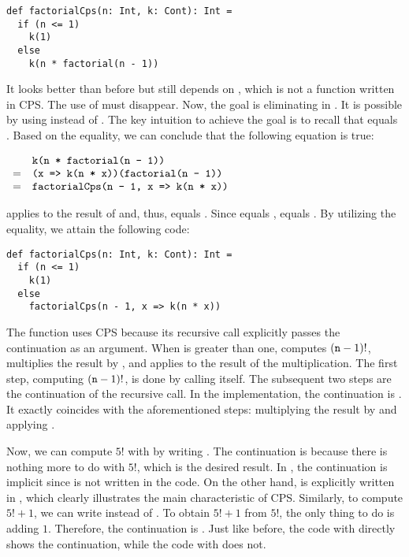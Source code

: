 \begin{verbatim}
def factorialCps(n: Int, k: Cont): Int =
  if (n <= 1)
    k(1)
  else
    k(n * factorial(n - 1))
\end{verbatim}

It looks better than before but still depends on , which is not
a function written in CPS. The use of  must disappear. Now, the
goal is eliminating  in . It is
possible by using  instead of . The key
intuition to achieve the goal is to recall that  equals
. Based on the equality, we can conclude that the following
equation is true:

$
\begin{array}{cl}
& \texttt{k(n * factorial(n - 1))} \\
= & \texttt{(x => k(n * x))(factorial(n - 1))} \\
= & \texttt{factorialCps(n - 1, x => k(n * x))} \\
\end{array}
$

 applies  to the
result of  and, thus, equals . Since  equals ,
 equals
. By utilizing the equality, we attain
the following code:

\begin{verbatim}
def factorialCps(n: Int, k: Cont): Int =
  if (n <= 1)
    k(1)
  else
    factorialCps(n - 1, x => k(n * x))
\end{verbatim}

The function uses CPS because its recursive call explicitly passes the
continuation as an argument. When  is greater than one,
 computes $(\texttt{n}-1)!$, multiplies the result by
, and applies  to the result of the multiplication. The first
step, computing $(\texttt{n}-1)!$, is done by calling  itself.
The subsequent two steps are the continuation of the recursive call. In the
implementation, the continuation is . It exactly coincides
with the aforementioned steps: multiplying the result by  and applying
.

Now, we can compute $5!$ with  by writing
.
The continuation is  because there is nothing more to do with
$5!$, which is the desired result. In , the continuation is
implicit since  is not written in the code. On the other hand,
 is explicitly written in , which
clearly illustrates the main characteristic of CPS.
Similarly, to compute $5!+1$, we can write 
instead of . To obtain $5!+1$ from $5!$, the only thing
to do is adding $1$. Therefore, the continuation is . Just like
before, the code with  directly shows the continuation,
while the code with  does not.

